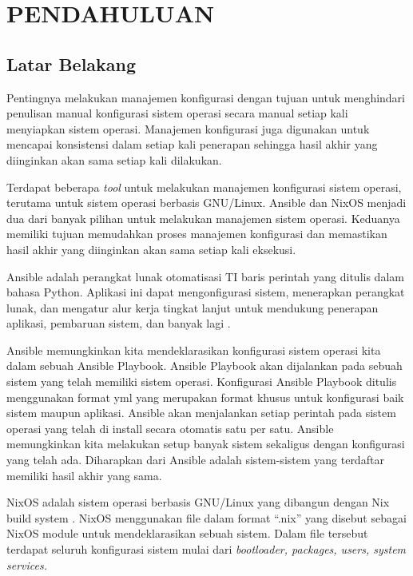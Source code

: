 \documentclass[10pt,]{report}
\begin{document}
\tableofcontents
\newpage
\listoftables
\newpage
\listoffigures
\chapter{PENDAHULUAN}
\section{Latar Belakang}
\begin{adjustwidth}{0.70cm}{}
	\vspace{-3mm}
	\hspace\parindent
	Pentingnya melakukan manajemen konfigurasi dengan tujuan untuk menghindari
	penulisan manual konfigurasi sistem operasi secara manual setiap kali
	menyiapkan sistem operasi. Manajemen konfigurasi juga digunakan untuk
	mencapai konsistensi dalam setiap kali penerapan sehingga hasil akhir yang
	diinginkan akan sama setiap kali dilakukan.

	Terdapat beberapa \textit{tool} untuk melakukan manajemen konfigurasi sistem operasi,
	terutama untuk sistem operasi berbasis GNU/Linux. Ansible dan NixOS menjadi
	dua dari banyak pilihan untuk melakukan manajemen sistem operasi. Keduanya
	memiliki tujuan memudahkan proses manajemen konfigurasi dan memastikan hasil
	akhir yang diinginkan akan sama setiap kali eksekusi.

	Ansible adalah perangkat lunak otomatisasi TI baris perintah yang ditulis
	dalam bahasa Python. Aplikasi ini dapat mengonfigurasi sistem, menerapkan
	perangkat lunak, dan mengatur alur kerja tingkat lanjut untuk mendukung
	penerapan aplikasi, pembaruan sistem, dan banyak lagi \parencite{AnsibleRedHat}.

	Ansible memungkinkan kita mendeklarasikan konfigurasi sistem operasi kita dalam
	sebuah Ansible Playbook. Ansible Playbook akan dijalankan pada sebuah sistem
	yang telah memiliki sistem operasi. Konfigurasi Ansible Playbook ditulis
	menggunakan format yml yang merupakan format khusus untuk konfigurasi baik
	sistem maupun aplikasi. Ansible akan menjalankan setiap perintah pada sistem
	operasi yang telah di install secara otomatis satu per satu. Ansible
	memungkinkan kita melakukan setup banyak sistem sekaligus dengan konfigurasi
	yang telah ada. Diharapkan dari Ansible adalah sistem-sistem yang terdaftar
	memiliki hasil akhir yang sama.

	NixOS adalah sistem operasi berbasis GNU/Linux yang dibangun dengan Nix build
	system \parencite{hownixworks} . NixOS menggunakan file dalam format “.nix”
	yang disebut sebagai NixOS module untuk mendeklarasikan sebuah sistem. Dalam
	file tersebut terdapat seluruh konfigurasi sistem mulai dari
	\textit{bootloader, packages, users, system services.}


\end{adjustwidth}
\end{document}
